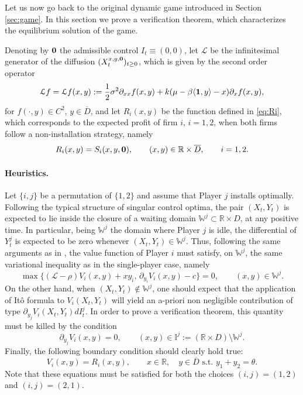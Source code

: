 \documentclass[10pt]{article}
\numberwithin{equation}{section}
\theoremstyle{plain}
\numberwithin{theorem}{section}
\theoremstyle{definition}
\def \R {\mathbb{R}}
\def \p {\partial}
\newcommand{\<}{\langle}
\renewcommand{\>}{\rangle}
\renewcommand{\(}{\left(}
\renewcommand{\)}{\right)}
\def \R  {{\mathbb {R}}}
\def \p {{\partial}}
\def \R {{\mathbb {R}}}
\def\cL{{\mathcal L}}
\begin{document}
{{{Let us now go back to the original {dynamic game introduced in Section \ref{sec:game}}. In this section we prove a verification theorem, which characterizes the equilibrium solution of the game. 

{Denoting by ${\bf 0}$ the admissible control $I_t \equiv (0,0)$, let}
$\cL$ be the infinitesimal generator of the diffusion $(X_t^{x,y,{\bf 0}})_{t\geq 0}$, which is given by the second order operator
\begin{equation}\label{eq:infinitesimal_generator}
\cL f=\cL f(x,y):=\frac{1}{2} \sigma^2 \p_{xx}f(x,y)+k(\mu - \beta \langle {\bf 1},y\rangle -x)\p_xf(x,y),
\end{equation}
for $f(\cdot,y)\in C^2$, $y\in\overline{D}$, and let $R_i(x,y)$ be the function defined in \eqref{eq:Ri}, which corresponds to the expected profit of firm $i$, $i=1,2$,  when both firms follow a non-installation strategy, namely
\begin{equation}%
R_i(x,y) = S_i(x,y,{\bf 0}), \qquad (x,y)\in \R\times \overline{D}, \qquad i=1,2.
\end{equation}
\paragraph{Heuristics.} Let $\{i,j\}$ be a permutation of $\{1,2\}$ and assume that Player $j$ installs optimally. Following the typical structure of singular control optima, the pair $(X_t, Y_t)$ is expected to lie inside the closure of a waiting domain $\mathbb{W}^j \subset \R \times D$, at any positive time. In particular, being $\mathbb{W}^j$ the domain where Player $j$ is idle, the differential of $Y^j_t$ is expected to be zero whenever $(X_t, Y_t) \in \mathbb{W}^j$. Thus, following the same arguments as in \cite{MR4305783}, the value function of Player $i$ must satisfy, on $\mathbb{W}^j$, the same variational inequality as in the single-player case, namely
\begin{equation}\label{HJB_bis}
\max\{(\cL-\rho)V_i(x,y)+xy_i,\, \p_{y_i}V_i(x,y)-c\}=0, \qquad(x,y)\in \mathbb{W}^j. %
\end{equation}
On the other hand, when $(X_t, Y_t) \notin \mathbb{W}^j$, one should expect that the application of It\^o formula to $V_i (X_t, Y_t)$ will yield an a-priori non negligible contribution of type $\partial_{y_j} V_i (X_t, Y_t) dI^{j}_t$. In order to prove a verification theorem, this quantity must be killed by the condition
\begin{equation}\label{HJB_ter}
\p_{y_j}V_i(x,y) = 0, \qquad (x,y)\in \mathbb{I}^j:= (\R\times D) \setminus \mathbb{W}^{j}.
\end{equation}
Finally, the following boundary condition should clearly hold true:
\begin{equation}\label{eq:terminal_cond}
V_i(x,y)=R_i(x,y), \qquad {x\in\R, \quad y\in \overline{D} \text{ s.t. } y_1 + y_2 = \theta.} %
\end{equation} 
Note that these equations must be satisfied for both the choices $(i,j) = (1,2)$ and $(i,j) = (2,1)$. %

}}}
\end{document}
